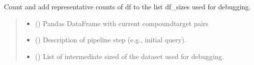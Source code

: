 \documentclass[letterpaper,10pt,english]{sphinxmanual}
\begin{document}
\begin{fulllineitems}
\label{\detokenize{get_stats:get_stats.add_dataset_sizes}}
\pysigstartsignatures
{}
\pysigstopsignatures
\sphinxAtStartPar
Count and add representative counts of df to the list df\_sizes used for debugging.
\begin{quote}\begin{description}
\begin{itemize}
\item {} 
\sphinxAtStartPar
{} () \textendash{} Pandas DataFrame with current compound\sphinxhyphen{}target pairs

\item {} 
\sphinxAtStartPar
{} () \textendash{} Description of pipeline step (e.g., initial query).

\item {} 
\sphinxAtStartPar
{} (\sphinxstyleliteralemphasis{\sphinxupquote{{[}}}\sphinxstyleliteralemphasis{\sphinxupquote{{[}}}\sphinxstyleliteralemphasis{\sphinxupquote{{]}}}\sphinxstyleliteralemphasis{\sphinxupquote{, }}\sphinxstyleliteralemphasis{\sphinxupquote{{[}}}\sphinxstyleliteralemphasis{\sphinxupquote{{]}}}\sphinxstyleliteralemphasis{\sphinxupquote{{]}}}) \textendash{} List of intermediate sized of the dataset used for debugging.

\end{itemize}

\end{description}\end{quote}

\end{fulllineitems}
\end{document}
